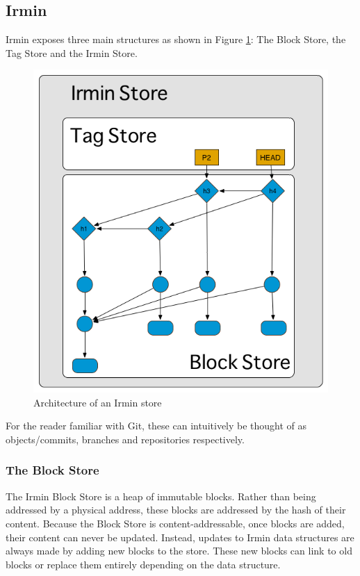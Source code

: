 \documentclass[12pt,a4paper,twoside,openright]{report}
\begin{document}
	\subsection{Irmin}
	Irmin exposes three main structures as shown in Figure \ref{fig:IrminBlockStore}: The Block Store, the Tag Store and the Irmin Store.
	\begin{figure}
		\begin{center}
		\includegraphics[width=13cm]{figs/irmin-stores.png}
		\caption{Architecture of an Irmin store}
		\label{fig:IrminBlockStore}
		\end{center}
	\end{figure}
	For the reader familiar with Git, these can intuitively be thought of as objects/commits, branches and repositories respectively.
	\subsubsection*{The Block Store}
	The Irmin Block Store is a heap of immutable blocks. 
	Rather than being addressed by a physical address, these blocks are addressed by the hash of their content.
	Because the Block Store is content-addressable, once blocks are added, their content can never be updated.
	Instead, updates to Irmin data structures are always made by adding new blocks to the store.
	These new blocks can link to old blocks or replace them entirely depending on the data structure.
\end{document}
